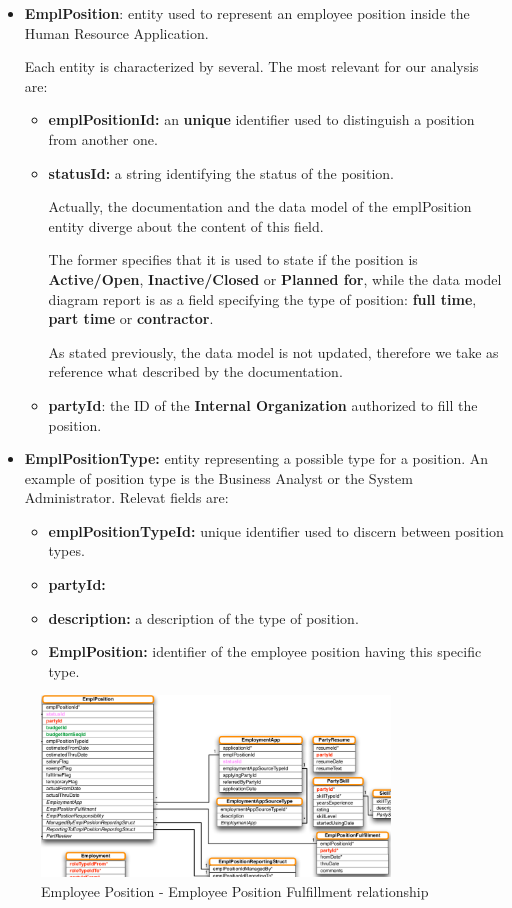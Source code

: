\begin{itemize}
	\item \textbf{EmplPosition}: entity used to represent an employee position inside the Human Resource Application. 

	Each entity is characterized by several. The most relevant for our analysis are:


	\begin{itemize}
		\item \textbf{emplPositionId:} an \textbf{unique} identifier used to distinguish a position from another one.
		\item \textbf{statusId:} a string identifying the status of the position.

		Actually, the documentation and the data model of the emplPosition entity diverge about the content of this field. 

		The former specifies that it is used to state if the position is \textbf{Active/Open}, \textbf{Inactive/Closed} or \textbf{Planned for}, while the data model diagram report is as a field specifying the type of position: \textbf{full time}, \textbf{part time} or \textbf{contractor}.

		As stated previously, the data model is not updated, therefore we take as reference what described by the documentation.
		\item \textbf{partyId}: the ID of the \textbf{Internal Organization} authorized to fill the position.
	\end{itemize}

	\item \textbf{EmplPositionType:} entity representing a possible type for a position. An example of position type is the Business Analyst or the System Administrator.
	Relevat fields are:

	\begin{itemize}
		\item \textbf{emplPositionTypeId:} unique identifier used to discern between position types.
		\item \textbf{partyId:}
		\item \textbf{description:} a description of the type of position.
		\item \textbf{EmplPosition:} identifier of the employee position having this specific type. 
	\end{itemize}  
\end{itemize}

\begin{figure}[H]
	\centerline{
		\includegraphics[width=350px]{../Datas/images/emplPos-fill.pdf}
	}
	\label{fig:emplPos-fill}
	\caption{Employee Position - Employee Position Fulfillment relationship}
\end{figure}

